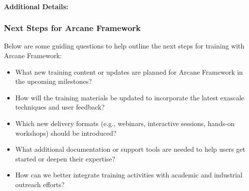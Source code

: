\paragraph{Additional Details:}


\subsubsection{Next Steps for Arcane Framework}
\label{sec:Arcane Framework:next-steps}

Below are some guiding questions to help outline the next steps for training with Arcane Framework:
\begin{itemize}
    \item What new training content or updates are planned for Arcane Framework in the upcoming milestones?
    \item How will the training materials be updated to incorporate the latest exascale techniques and user feedback?
    \item Which new delivery formats (e.g., webinars, interactive sessions, hands-on workshops) should be introduced?
    \item What additional documentation or support tools are needed to help users get started or deepen their expertise?
    \item How can we better integrate training activities with academic and industrial outreach efforts?
\end{itemize}